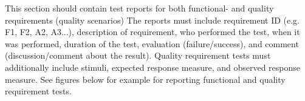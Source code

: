 
This section should contain test reports for both functional- and quality requirements (quality scenarios)
The reports must include requirement ID (e.g. F1, F2, A2, A3...), description of requirement, who performed the test, when it was performed, duration of the test, evaluation (failure/success), and comment (discussion/comment about the result).
Quality requirement tests must additionally include stimuli, expected response measure, and observed response measure.
See figures below for example for reporting functional and quality
requirement tests.
